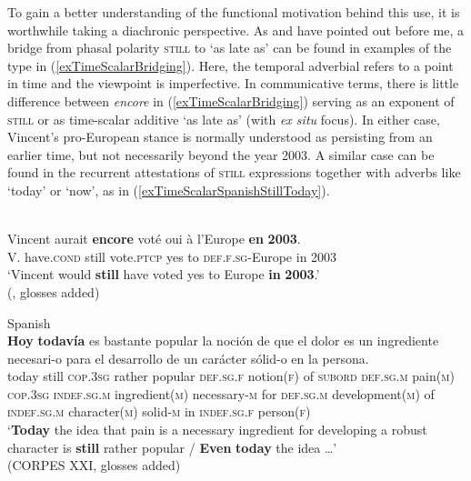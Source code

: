 To gain a better understanding of the functional motivation behind this use, it is worthwhile taking a diachronic perspective. As  \textcite[161–162]{MosegaardHansen2008} and \textcite{Shetter1966} have pointed out before me, a bridge from phasal polarity \textsc{still} to \lq as late as\rq{ }can be found in examples of the type in (\ref{exTimeScalarBridging}). Here, the temporal adverbial refers to a point in time and the viewpoint is imperfective. In communicative terms, there is little difference between \textit{encore} in (\ref{exTimeScalarBridging}) serving as an exponent of \textsc{still} or as time-scalar additive \lq as late as\rq{ }(with \textit{ex situ} focus). In either case, Vincent's pro-European stance is normally understood as persisting from an earlier time, but not necessarily beyond the year 2003. A similar case can be found in the recurrent attestations of \textsc{still} expressions together with adverbs like \lq today' or \lq now\rq{}, as in (\ref{exTimeScalarSpanishStillToday}).


\begin{exe}
	\ex\label{exTimeScalarBridging}\\
	\gll Vincent aurait \textbf{encore} voté oui à l’Europe \textbf{en} \textbf{2003}.\\
	V. have.\textsc{cond} still vote.\textsc{ptcp} yes to \textsc{def}.\textsc{f}.\textsc{sg}-Europe in 2003\\
	\glt \lq Vincent would \textbf{still} have voted yes to Europe \textbf{in} \textbf{2003}.’
	\\(\cite[160–161]{MosegaardHansen2008},  glosses added)

	\ex Spanish\label{exTimeScalarSpanishStillToday}\\
	\gll \textbf{Hoy} \textbf{todavía} es bastante popular la noción de que el dolor es un ingrediente necesari-o para el desarrollo de un carácter sólid-o en la persona.\\
today still \textsc{cop}.3\textsc{sg} rather popular \textsc{def}.\textsc{sg}.\textsc{f} notion(\textsc{f}) of \textsc{subord} \textsc{def}.\textsc{sg}.\textsc{m} pain(\textsc{m}) \textsc{cop}.3\textsc{sg} \textsc{indef}.\textsc{sg}.\textsc{m} ingredient(\textsc{m}) necessary-\textsc{m} for \textsc{def}.\textsc{sg}.\textsc{m} development(\textsc{m}) of \textsc{indef}.\textsc{sg}.\textsc{m} character(\textsc{m}) solid-\textsc{m} in \textsc{indef}.\textsc{sg}.\textsc{f} person(\textsc{f})\\
	\glt \lq \textbf{Today} the idea that pain is a necessary ingredient for developing a robust character is \textbf{still} rather popular / \textbf{Even} \textbf{today} the idea …'\\(CORPES XXI,  glosses added)
  \end{exe}

